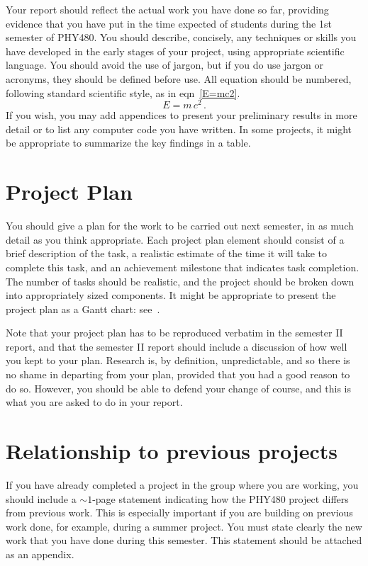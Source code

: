 \documentclass[a4paper,11pt]{article}
\begin{document}
Your report should reflect the actual work you have done so far, providing evidence that you have put in the time expected of students during the 1st semester of PHY480. You should describe, concisely, any techniques or skills you have developed in the early stages of your project,
using appropriate scientific language. You should avoid the use of jargon, but if you do use jargon or acronyms, they should be defined before use. All equation should be numbered, following standard scientific style, as in eqn~\ref{E=mc2}.
\begin{equation}
\label{E=mc2}
E = m\,c^2 \, .
\end{equation}
If you wish, you may add appendices to present your preliminary results in more detail or to list any computer code you have written. In some projects, it might be appropriate to summarize the key findings in a table.



\section{Project Plan}
You should give a plan for the work to be carried out next semester, in as much detail as you think appropriate. Each project plan element should consist of a brief description of the task, a realistic estimate of the time it will take to complete this task, and an achievement milestone that indicates task completion. The number of tasks should be realistic, and the project should be broken down into appropriately sized components. It might be appropriate to present the project plan as a Gantt chart: see~\cite{gannt}.

Note that your project plan has to be reproduced verbatim in the semester II report, and that the semester II report should include a discussion of how well you kept to your plan. Research is, by definition, unpredictable, and so there is no shame in departing from your plan, provided that you had a good reason to do so. However, you should be able to defend your change of course, and this is what you are asked to do in your report.  

\section{Relationship to previous projects}
If you have already completed a project in the group where you are working, you should include a $\sim 1$-page statement indicating how the PHY480 project differs from previous work. This is especially important if you are building on previous work done, for example, during a summer project. You must state clearly the new work that you have done during this semester. This statement should be attached as an appendix.
\end{document}
